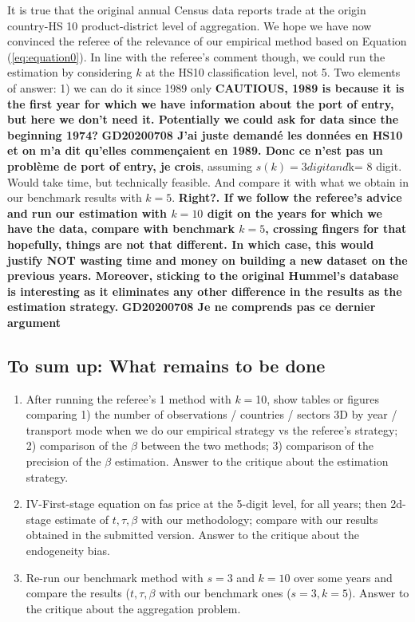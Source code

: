\documentclass[a4paper,12pt]{article}
\begin{document}
It is true that the original annual Census data reports trade at the origin country-HS 10 product-district level of aggregation. We hope we have now convinced the referee of the relevance of our empirical method based on Equation (\ref{eq:equation0}). In line with the referee's comment though, we could run the estimation by considering $k$ at the HS10 classification level, not 5. Two elements of answer: 1) we can do it since 1989 only \textbf{CAUTIOUS, 1989 is because it is the first year for which we have information about the port of entry, but here we don't need it. Potentially we could ask for data since the beginning 1974? }\textbf{GD20200708 J’ai juste demandé les données en HS10 et on m’a dit qu’elles commençaient en 1989. Donc ce n’est pas un problème de port of entry, je crois}, assuming $s(k) = 3 digit and $k= 8 digit. Would take time, but technically feasible. And compare it with what we obtain in our benchmark results with $k=5$. \textbf{Right?. If we follow the referee's advice and run our estimation with $k=10$ digit on the years for which we have the data, compare with benchmark $k=5$, crossing fingers for that hopefully, things are not that different. In which case, this would justify NOT wasting time and money on building a new dataset on the previous years. Moreover, sticking to the original Hummel's database is interesting as it eliminates any other difference in the results as the estimation strategy.} \textbf{GD20200708 Je ne comprends pas ce dernier argument}



\subsection{To sum up: What remains to be done}

\begin{enumerate}
\item\label{bp:1} After running the referee's 1 method with $k=$10, show tables or figures comparing 1) the number of observations / countries / sectors 3D by year / transport mode when we do our empirical strategy vs the referee's strategy; 2) comparison of the $\beta$ between the two methods; 3) comparison of the precision of the $\beta$ estimation. Answer to the critique about the estimation strategy.
\item\label{bp:2} IV-First-stage equation on fas price at the 5-digit level, for all years; then 2d-stage estimate of $t,\tau, \beta$ with our methodology; compare with our results obtained in the submitted version. Answer to the critique about the endogeneity bias.
\item\label{bp:3} Re-run our benchmark method with $s=3$ and $k=10$ over some years and compare the results ($t,\tau,\beta$ with our benchmark ones ($s=3,k=5$). Answer to the critique about the aggregation problem.
\end{enumerate}
\end{document}
